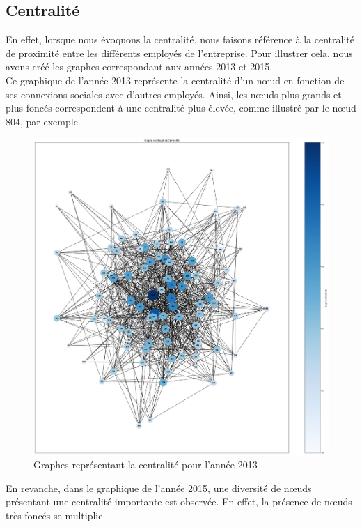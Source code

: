 \documentclass{article}
\begin{document}
\subsection{Centralité}

En effet, lorsque nous évoquons la centralité, nous faisons référence à la centralité de proximité entre les différents employés de l'entreprise. Pour illustrer cela, nous avons créé les graphes correspondant aux années 2013 et 2015. \\

Ce graphique de l'année 2013 représente la centralité d'un nœud en fonction de ses connexions sociales avec d'autres employés. Ainsi, les nœuds plus grands et plus foncés correspondent à une centralité plus élevée, comme illustré par le nœud 804, par exemple.

\begin{figure}[!h]
    \centering
    \includegraphics[width=15cm]{assets/centralite/deg_centralite_2013.png}
    \caption{Graphes représentant la centralité pour l'année 2013}
    \label{fig:deg_centralite_2013}
\end{figure}

En revanche, dans le graphique de l'année 2015, une diversité de nœuds présentant une centralité importante est observée. En effet, la présence de nœuds très foncés se multiplie.
\end{document}
